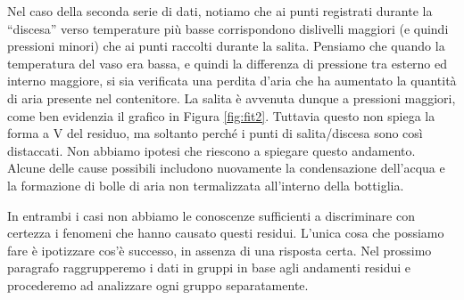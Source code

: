 Nel caso della seconda serie di dati, notiamo che ai punti registrati durante la ``discesa'' verso temperature più basse
corrispondono dislivelli maggiori (e quindi pressioni minori) che ai punti raccolti durante la salita. Pensiamo che quando
la temperatura del vaso era bassa, e quindi la differenza di pressione tra esterno ed interno maggiore, si sia verificata una perdita d'aria
che ha aumentato la quantità di aria presente nel contenitore. La salita è avvenuta dunque a pressioni maggiori, come
ben evidenzia il grafico in Figura \ref{fig:fit2}. Tuttavia questo non spiega la forma a V del residuo, ma soltanto perché i punti
di salita/discesa sono così distaccati. Non abbiamo ipotesi che riescono a spiegare questo andamento. Alcune delle cause possibili
includono nuovamente la condensazione dell'acqua e la formazione di bolle di aria non termalizzata all'interno della bottiglia.

In entrambi i casi non abbiamo le conoscenze sufficienti a discriminare con certezza i fenomeni che hanno causato questi residui. L'unica cosa che
possiamo fare è ipotizzare cos'è successo, in assenza di una risposta certa. Nel prossimo paragrafo raggrupperemo i dati
in gruppi in base agli andamenti residui e procederemo ad analizzare ogni gruppo separatamente.


